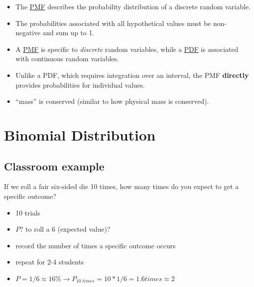 \documentclass[
  a4paper,
]{scrbook}
\providecommand{\tightlist}{%
  \setlength{\itemsep}{0pt}\setlength{\parskip}{0pt}}\usepackage{longtable,booktabs,array}
\begin{document}
\begin{itemize}
\item
  The \hyperref[acronyms_PMF]{PMF} describes the probability
  distribution of a discrete random variable.
\item
  The probabilities associated with all hypothetical values must be
  non-negative and sum up to 1.
\item
  A \hyperref[acronyms_PMF]{PMF} is specific to \emph{discrete} random
  variables, while a \hyperref[acronyms_PDF]{PDF} is associated with
  continuous random variables.
\item
  Unlike a PDF, which requires integration over an interval, the PMF
  \textbf{directly} provides probabilities for individual values.
\item
  ``mass'' is conserved (similar to how physical mass is conserved).
\end{itemize}

\section{Binomial Distribution}\label{binomial-distribution}

\subsection{Classroom example}\label{classroom-example}

If we roll a fair six-sided die 10 times, how many times do you expect
to get a specific outcome?

\begin{itemize}
\tightlist
\item
  10 trials
\item
  \(P?\) to roll a \(6\) (expected value)?
\item
  record the number of times a specific outcome occurs
\item
  repeat for 2-4 students
\end{itemize}

\begin{itemize}
\tightlist
\item
  \(P = 1/6 \approx 16\% \rightarrow P_{10\;times} = 10 * 1/6 = 1.6 times \approx 2\)
\end{itemize}
\end{document}
